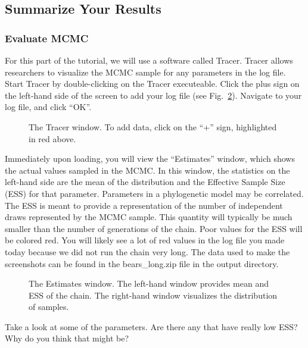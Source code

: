 \subsection{Summarize Your Results}\label{subsect:RB-SummarizeResults}

\medskip
\subsubsection{Evaluate MCMC}\label{subsub:RB-EvalMCMC}

For this part of the tutorial, we will use a software called Tracer. Tracer allows researchers to visualize the MCMC sample for any parameters in the log file. Start Tracer by double-clicking on the Tracer executeable. Click the plus sign on the left-hand side of the screen to add your log file (see Fig.\ \ref{fig:tracer}). Navigate to your log file, and click ``OK''. \par
\begin{figure}[h!]
\centering
{}
\caption{\small The Tracer window. To add data, click on the ``+'' sign, highlighted in red above.}
\label{fig:tracer}
\end{figure}
Immediately upon loading, you will view the ``Estimates'' window, which shows the actual values sampled in the MCMC. In this window, the statistics on the left-hand side are the mean of the distribution and the Effective Sample Size (ESS) for that parameter. Parameters in a phylogenetic model may be correlated. The ESS is meant to provide a representation of the number of independent draws represented by the MCMC sample. This quantity will typically be much smaller than the number of generations of the chain. Poor values for the ESS will be colored red. You will likely see a lot of red values in the log file you made today because we did not run the chain very long. The data used to make the screenshots can be found in the bears\_long.zip file in the output directory. \par
\begin{figure}[h!]
\centering
{}
\caption{\small The Estimates window. The left-hand window provides mean and ESS of the chain. The right-hand window visualizes the distribution of samples.}
\label{fig:tracer}
\end{figure}
Take a look at some of the parameters. Are there any that have really low ESS? Why do you think that might be? \par

